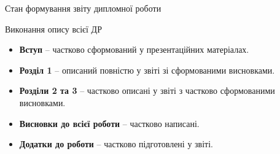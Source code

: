 \begin{frame}{Стан формування звіту дипломної роботи}
    \begin{exampleblock}{Виконання опису всієї ДР }
        \begin{itemize}
            \item \textbf{Вступ} -- частково сформований у презентаційних матеріалах.
            \item \textbf{Розділ 1} -- описаний повністю у звіті зі сформованими висновками.
            \item \textbf{Розділи 2 та 3} -- частково описані у звіті з частково сформованими висновками.
            \item \textbf{Висновки до всієї роботи} -- частково написані.
            \item \textbf{Додатки до роботи} -- частково підготовлені у звіті.
        \end{itemize}
    \end{exampleblock}
\end{frame}
